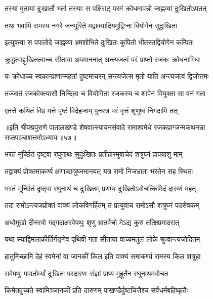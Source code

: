 \twolineshloka
{तस्यां मृतायां दुःखार्तो भर्ता तस्याः स पक्षिराट्}
{परमं क्रोधमापन्नो जाह्नव्यां दुःखितोऽपतत्}%

\twolineshloka
{तथा भवामि रामस्य नगरे जनपूरिते}
{मद्वाक्यादियमुद्विग्ना वियोगेन सुदुःखिता}%

\twolineshloka
{इत्युक्त्वा स पपातोदे जाह्नव्या भ्रमशोभिते}
{दुःखितः कुपितो भीतस्तद्वियोगेन कम्पितः}%

\twolineshloka
{क्रुद्धत्वाद्दुःखितत्वाच्च सीताया अपमाननात्}
{अन्त्यजत्वं परं प्राप्तो रजकः क्रोधनाभिधः}%

\twolineshloka
{यः क्रोधाच्च स्वकान्प्राणान्महतां दुष्टमाचरन्}
{सन्त्यजेत्स मृतो याति अन्त्यजत्वं द्विजोत्तमः}%

\twolineshloka
{तज्जातं रजकोक्त्यासौ निन्दिता च वियोगिता}
{रजकस्य च शापेन वियुक्ता सा वनं गता}%

\twolineshloka
{एतत्ते कथितं विप्र यत्ते पृष्टं विदेहजाम्}
{पुनरत्र परं वृत्तं शृणुष्व निगदामि तत्}%


॥इति श्रीपद्मपुराणे पातालखण्डे शेषवात्स्यायनसंवादे रामाश्वमेधे रजकप्राग्जन्मकथनन्ना सप्तपञ्चाशत्तमोऽध्यायः॥५७॥



\twolineshloka
{भरतं मूर्च्छितं दृष्ट्वा रघुनाथः सुदुःखितः}
{प्रतीहारमुवाचेदं शत्रुघ्नं प्रापयाशु माम्}%

\twolineshloka
{तद्वाक्यं प्रोक्तमाकर्ण्य क्षणाच्छत्रुघ्नमानयत्}
{यत्र रामो निजभ्राता भरतेन सह स्थितः}%

\twolineshloka
{भरतं मूर्च्छितं दृष्ट्वा रघुनाथं च दुःखितम्}
{प्रणम्य दुःखितोऽवोचत्किमिदं दारुणं महत्}%

\twolineshloka
{तदा रामोऽन्त्यजप्रोक्तं वाक्यं लोकविगर्हितम्}
{तं प्रत्युवाच रामोऽसौ शत्रुघ्नं पदसेवकम्}%

\twolineshloka
{अधोमुखो दीनरवो गद्गदाक्षरवेपथुः}
{शृणु भ्रातर्वचो मेऽद्य कुरु तत्क्षिप्रमादरात्}%

\twolineshloka
{यथा स्याद्विमलाकीर्तिर्गङ्गेव पृथिवीं गता}
{सीताया वाच्यमतुलं लोके श्रुत्वान्त्यजोदितम्}%

\twolineshloka
{हातुमिच्छामि देहं स्वमेनां वा जानकीं किल}
{इति वाक्यं समाकर्ण्य रामस्य किल शत्रुहा}%

\twolineshloka
{सवेपथुः पपातोर्व्यां दुःखितः परदारणः}
{संज्ञां प्राप्य मुहूर्तेन रघुनाथमवोचत}%


\twolineshloka
{किमेतदुच्यते स्वामिञ्जानकीं प्रति दारुणम्}
{पाखण्डैर्दुष्टचित्तैश्च सर्वधर्मबहिष्कृतैः}%

